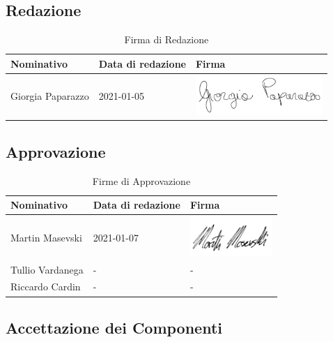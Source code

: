 \documentclass[../piano_di_progetto.tex]{subfiles}
\begin{document}
\subsection{Redazione}%
\label{sub:red}

\begin{table}[!ht]
	\centering
	\begin{tabular}{|l|l|l|}
		\hline
		\rowcolor{lightgray}
		\textbf{Nominativo} & \textbf{Data di redazione} & \textbf{Firma} \\ 
		\hline
			Giorgia Paparazzo & 2021-01-05 & \includegraphics[height=1.5cm]{componenti/img/firma_gp} \\
		\hline
	\end{tabular}
	\caption{Firma di Redazione}
\end{table}


\subsection{Approvazione}%
\label{sub:app}

\begin{table}[!ht]
	\centering
	\begin{tabular}{|l|l|l|}
		\hline
		\rowcolor{lightgray}
		\textbf{Nominativo} & \textbf{Data di redazione} & \textbf{Firma} \\ 

		\hline
			Martin Masevski & 2021-01-07 & \includegraphics[height=1.5cm]{componenti/img/firma_mm} \\ 
		\hline
			Tullio Vardanega & - & - \\
		\hline
			Riccardo Cardin  & - & - \\
		\hline
	\end{tabular}
		\caption{Firme di Approvazione}
\end{table}


\newpage
\subsection{Accettazione dei Componenti}%
\label{sub:acc_comp}
\end{document}

